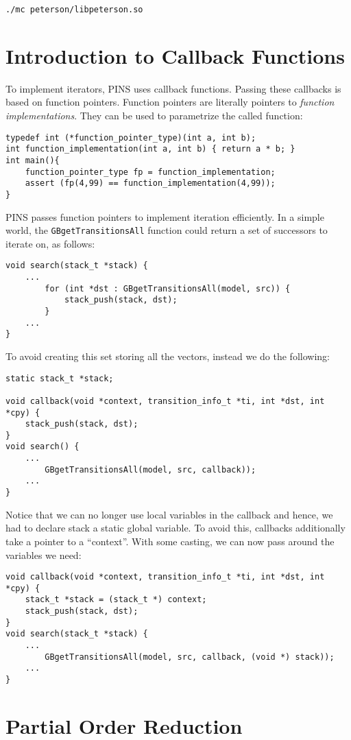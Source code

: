 \documentclass[12pt]{article}
\begin{document}
\texttt{./mc peterson/libpeterson.so}


\section{Introduction to Callback Functions}

To implement iterators, PINS uses callback functions.
Passing these callbacks is based on function pointers.
Function pointers are literally pointers to
\emph{function implementations}.
They can be used to parametrize the called function:
\begin{verbatim}
typedef int (*function_pointer_type)(int a, int b);
int function_implementation(int a, int b) { return a * b; }
int main(){
    function_pointer_type fp = function_implementation;
    assert (fp(4,99) == function_implementation(4,99));
}
\end{verbatim}
PINS passes function pointers to implement iteration efficiently.
In a simple world, the \texttt{GBgetTransitionsAll} function
could return a set of successors to iterate on, as follows:
\begin{verbatim}
void search(stack_t *stack) {
    ...
        for (int *dst : GBgetTransitionsAll(model, src)) {
            stack_push(stack, dst);
        }
    ...
}
\end{verbatim}
To avoid creating this set storing all
the vectors, instead we do the following:
\begin{verbatim}
static stack_t *stack;

void callback(void *context, transition_info_t *ti, int *dst, int *cpy) {
    stack_push(stack, dst);
}
void search() {
    ...
        GBgetTransitionsAll(model, src, callback));
    ...
}
\end{verbatim}
Notice that we can no longer use local variables in the callback
and hence, we had to declare stack a static global variable.
To avoid this, callbacks additionally take a pointer to a
``context''. With some casting, we can now pass around the variables we need:
\begin{verbatim}
void callback(void *context, transition_info_t *ti, int *dst, int *cpy) {
	stack_t *stack = (stack_t *) context;
    stack_push(stack, dst);
}
void search(stack_t *stack) {
    ...
        GBgetTransitionsAll(model, src, callback, (void *) stack));
    ...
}
\end{verbatim}



\section{Partial Order Reduction}
\end{document}
